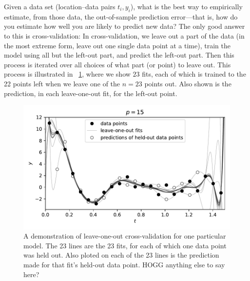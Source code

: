 \documentclass[12pt,letterpaper]{article}
\newlength{\figurewidth}
\begin{document}
Given a data set (location--data pairs $t_i, y_i$), what is the best way to empirically estimate, from those data, the out-of-sample prediction error---that is, how do you estimate how well you are likely to predict new data?
The only good answer to this is cross-validation:
In cross-validation, we leave out a part of the data (in the most extreme form, leave out one single data point at a time), train the model using all but the left-out part, and predict the left-out part. Then this process is iterated over all choices of what part (or point) to leave out.
This process is illustrated in \figurename~\ref{fig:loo}, where we show $23$ fits, each of which is trained to the 22 points left when we leave one of the $n=23$ points out.
Also shown is the prediction, in each leave-one-out fit, for the left-out point.
\begin{figure}[t]
    \begin{mdframed}
    \includegraphics[width=\figurewidth]{paper/LOO.pdf}
    \caption{A demonstration of leave-one-out cross-validation for one particular model. The 23 lines are the 23 fits, for each of which one data point was held out. Also ploted on each of the 23 lines is the prediction made for that fit's held-out data point. HOGG anything else to say here?}
    \label{fig:loo}
    \end{mdframed}
\end{figure}
\end{document}
